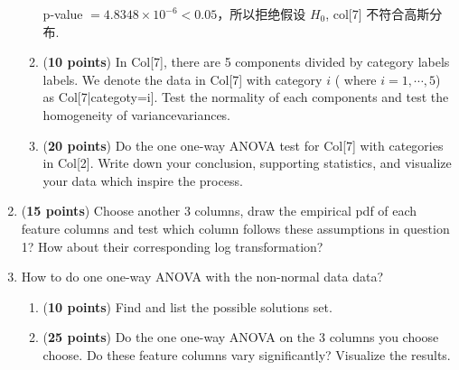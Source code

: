 \documentclass[degree=project, degree-type=project]{thuthesis}
\begin{document}
\begin{enumerate}
\begin{enumerate}
         p-value $= 4.8348\times 10^{-6} < 0.05$，所以拒绝假设 $H_0$, col[7] 不符合高斯分布.

       \item (\textbf{10 points}) In Col[7], there are 5 components divided by category labels labels. We denote the data in Col[7] with category $i$ ( where $i = 1,\cdots,5$) as Col[7|categoty=i]. Test the normality of each components and test the homogeneity of variancevariances.

       \item (\textbf{20 points}) Do the one one-way ANOVA test for Col[7] with categories in Col[2]. Write down your conclusion, supporting statistics, and visualize your data which inspire the process.
     \end{enumerate}

   \item (\textbf{15 points}) Choose another 3 columns, draw the empirical pdf of each feature columns and test which column follows these assumptions in question 1? How about their corresponding log transformation?

   \item How to do one one-way ANOVA with the non-normal data data?
     \begin{enumerate}
       \item (\textbf{10 points}) Find and list the possible solutions set.
       \item (\textbf{25 points}) Do the one one-way ANOVA on the 3 columns you choose choose. Do these feature columns vary significantly? Visualize the results.
     \end{enumerate}
\end{enumerate}

\backmatter


\appendix
\end{document}
